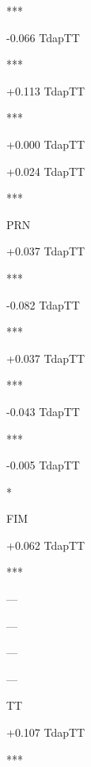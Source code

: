 \documentclass[
]{article}
\begin{document}
{}{}

***

{-0.066} {{Tdap}{TT}}

{}{}

{}{}

***

{+0.113} {{Tdap}{TT}}

{}{}

{}{}

***

{+0.000} {{Tdap}{TT}}

{}{}

{}{}

{}

{+0.024} {{Tdap}{TT}}

{}{}

{}{}

***

PRN

{+0.037} {{Tdap}{TT}}

{}{}

{}{}

***

{-0.082} {{Tdap}{TT}}

{}{}

{}{}

***

{+0.037} {{Tdap}{TT}}

{}{}

{}{}

***

{-0.043} {{Tdap}{TT}}

{}{}

{}{}

***

{-0.005} {{Tdap}{TT}}

{}{}

{}{}

*

FIM

{+0.062} {{Tdap}{TT}}

{}{}

{}{}

***

---

---

---

---

TT

{+0.107} {{Tdap}{TT}}

{}{}

{}{}

***
\end{document}
